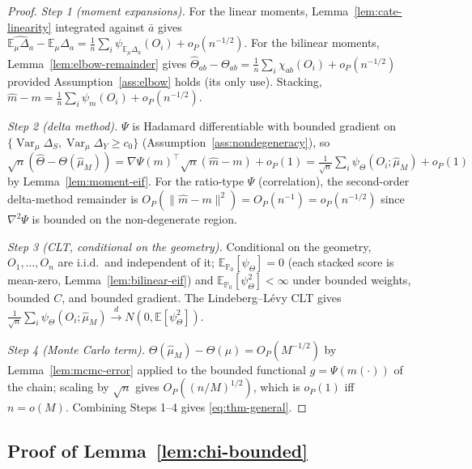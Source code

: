 \documentclass[11pt]{article}
\theoremstyle{plain}
\theoremstyle{definition}
\theoremstyle{remark}
\newcommand{\E}{\mathbb{E}}
\newcommand{\PP}{\mathbb{P}}
\newcommand{\Qhat}{\widehat{\mu}_M}
\DeclareMathOperator{\Var}{Var}
\begin{document}
\begin{proof}
\emph{Step 1 (moment expansions).} For the linear moments,
Lemma~\ref{lem:cate-linearity} integrated against $\bar a$ gives
$\widehat{\E_\mu\Delta_a}-\E_\mu\Delta_a=\frac1n\sum_i\psi_{\E_\mu\Delta_a}(O_i)+o_P(n^{-1/2})$.
For the bilinear moments, Lemma~\ref{lem:elbow-remainder} gives
$\hat\Theta_{ab}-\Theta_{ab}=\frac1n\sum_i\chi_{ab}(O_i)+o_P(n^{-1/2})$ provided
Assumption~\ref{ass:elbow} holds (its only use). Stacking,
$\hat m-m=\frac1n\sum_i\psi_m(O_i)+o_P(n^{-1/2})$.

\emph{Step 2 (delta method).} $\Psi$ is Hadamard differentiable with bounded gradient
on $\{\Var_\mu\Delta_S,\Var_\mu\Delta_Y\ge c_0\}$ (Assumption~\ref{ass:nondegeneracy}),
so
$\sqrt n(\hat\Theta-\Theta(\Qhat))=\nabla\Psi(m)^\top\sqrt n(\hat m-m)+o_P(1)
=\frac1{\sqrt n}\sum_i\psi_\Theta(O_i;\Qhat)+o_P(1)$ by Lemma~\ref{lem:moment-eif}.
For the ratio-type $\Psi$ (correlation), the second-order delta-method remainder is
$O_P(\|\hat m-m\|^2)=O_P(n^{-1})=o_P(n^{-1/2})$ since $\nabla^2\Psi$ is bounded on the
non-degenerate region.

\emph{Step 3 (CLT, conditional on the geometry).} Conditional on the geometry,
$O_1,\dots,O_n$ are i.i.d.\ and independent of it; $\E_{\PP_0}[\psi_\Theta]=0$ (each
stacked score is mean-zero, Lemma~\ref{lem:bilinear-eif}) and
$\E_{\PP_0}[\psi_\Theta^2]<\infty$ under bounded weights, bounded $C$, and bounded
gradient. The Lindeberg--L\'evy CLT gives
$\frac1{\sqrt n}\sum_i\psi_\Theta(O_i;\Qhat)\xrightarrow{d}N(0,\E[\psi_\Theta^2])$.

\emph{Step 4 (Monte Carlo term).} $\Theta(\Qhat)-\Theta(\mu)=O_P(M^{-1/2})$ by
Lemma~\ref{lem:mcmc-error} applied to the bounded functional $g=\Psi(m(\cdot))$ of the
chain; scaling by $\sqrt n$ gives $O_P((n/M)^{1/2})$, which is $o_P(1)$ iff $n=o(M)$.
Combining Steps 1--4 gives \eqref{eq:thm-general}.
\end{proof}

\subsection{Proof of Lemma~\ref{lem:chi-bounded}}\label{app:proof-chi-bounded}
\end{document}
